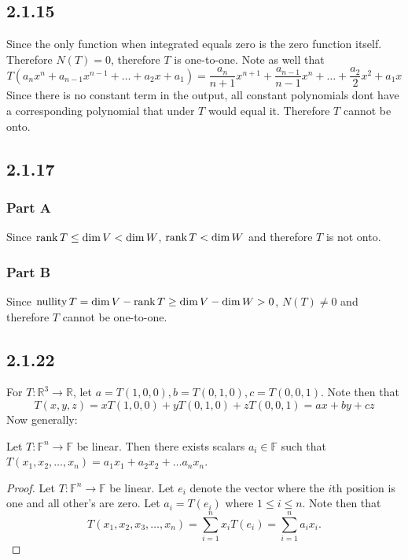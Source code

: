 \documentclass[12pt,titlepage]{extarticle}
\begin{document}
\subsection*{2.1.15}
Since the only function when integrated equals zero is the zero function itself. Therefore $N(T) = \qty{0}$, therefore $T$ is one-to-one. Note as well that
\[
    T(a_n x^n + a_{n-1} x^{n-1} + \ldots + a_{2} x + a_1) = \frac{a_n}{n+1} x^{n+1} + \frac{a_{n-1}}{n-1} x^n + \ldots + \frac{a_{2}}{2} x^2 + a_1 x
\]
Since there is no constant term in the output, all constant polynomials dont have a corresponding polynomial that under $T$ would equal it. Therefore $T$ cannot be onto.

\subsection*{2.1.17}
\subsubsection*{Part A}
Since $\rank T \leq \dim V < \dim W$, $\rank T < \dim W$ and therefore $T$ is not onto.

\subsubsection*{Part B}
Since $\operatorname{nullity} T = \dim V - \rank T \geq \dim V - \dim W > 0$, $N(T) \neq \qty{0}$ and therefore $T$ cannot be one-to-one. 

\subsection*{2.1.22}
For $T : \mathbb{R}^3 \to \mathbb{R}$, let $a = T(1,0,0), b = T(0,1,0), c = T(0,0,1)$. Note then that
\[
    T(x,y,z) = x T(1,0,0) + y T(0,1,0) + z T(0,0,1) = ax + by + cz
\]
Now generally:
\begin{theorem}
    Let $T : \mathbb{F}^n \to \mathbb{F}$ be linear. Then there exists scalars $a_i \in \mathbb{F}$ such that $T(x_1, x_2, \ldots, x_n) = a_1 x_1 + a_2 x_2 + \ldots a_n x_n$.
\end{theorem}
\begin{proof}
    Let $T : \mathbb{F}^n \to \mathbb{F}$ be linear. Let $e_i$ denote the vector where the $i$th position is one and all other's are zero. Let $a_i = T(e_i)$ where $1 \leq i \leq n$. Note then that
    \[
        T(x_1, x_2, x_3, \ldots, x_n) = \sum_{i=1}^{n} x_i T(e_i) = \sum_{i=1}^n a_i x_i.
    \]
\end{proof}
\end{document}
